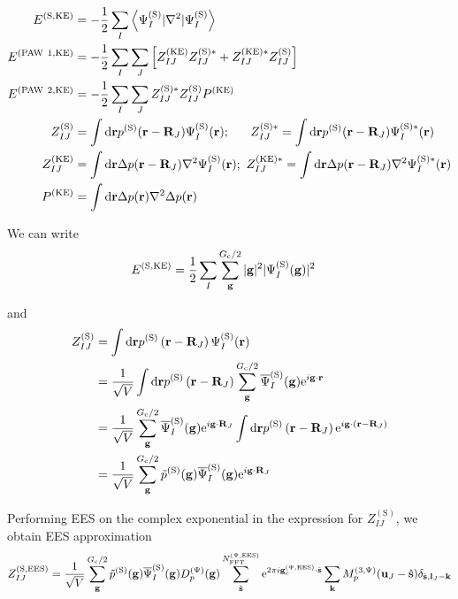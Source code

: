 \documentclass[paper=a4, fontsize=11pt]{article} %
\numberwithin{equation}{section} %
\numberwithin{figure}{section} %
\numberwithin{table}{section} %
\newcommand{\bu}{{\bf{u}}}
\newcommand{\bl}{{\bf{l}}}
\newcommand{\bk}{{\bf{k}}}
\newcommand{\bs}{{\bf{s}}}
\newcommand{\bg}{{\bf{g}}}
\newcommand{\br}{{\bf{r}}}
\newcommand{\bR}{{\bf{R}}}
\newcommand{\rS}{{\mathrm{S}}}
\newcommand{\rKE}{{\mathrm{KE}}}
\newcommand{\rEES}{{\mathrm{EES}}}
\newcommand{\re}{{\mathrm{e}}}
\newcommand{\rP}{{\mathrm{PAW}}}
\newcommand{\rd}{{\mathrm{d}}}
\newcommand{\ibgR}{i\bg\cdot\bR}
\newcommand{\ibgr}{i\bg\cdot\br}
\newcommand{\gcpEES}{{\bg_c^{(\Psi,\rEES)}}}
\newcommand{\igcps}{2\pi i\gcpEES\cdot\hat \bs}
\newcommand{\psigs}{{\overline \Psi_I^{(\rS)}(\bg)}}
\newcommand{\NFFTpEES}{{N^{\mathrm{(\Psi,\rEES})}_{\mathrm{FFT}}}}
\newcommand{\Gc}{{G_{\mathrm{c}}}}
\newcommand{\Dpg}{{D^{(\Psi)}_p(\bg)}}
\newcommand{\Mp}{{M_p^{(3,\Psi)}}}
\begin{document}
\begin{equation}
\begin{split}
E^{(\rS,\rKE)}
& = -\frac{1}{2}\sum_I \left<\Psi_I^{(\rS)}|\nabla^2|\Psi_I^{(\rS)}\right> \\
E^{(\rP\ 1,\rKE)}
&= -\frac{1}{2}\sum_I \sum_J \left[Z_{IJ}^{(\rKE)}Z_{IJ}^{(\rS)*} + Z_{IJ}^{(\rKE)*}Z_{IJ}^{(\rS)} \right]\\
E^{(\rP\ 2,\rKE)}
&= -\frac{1}{2}\sum_I \sum_J Z_{IJ}^{(\rS)*}Z_{IJ}^{(\rS)}P^{(\rKE)}\\
Z_{IJ}^{(\rS)}
& = \int \rd\br  p^{(\rS)}( \br -\bR_J )\Psi_I^{(\rS)}(\br);\ \ \ \ \ Z_{IJ}^{(\rS)*}
= \int \rd\br  p^{(\rS)}( \br -\bR_J )\Psi_I^{(\rS)*}(\br)  \\
Z_{IJ}^{(\rKE)}
& = \int \rd\br\Delta p( \br -\bR_J )\nabla^2\Psi_I^{(\rS)}(\br);\ Z_{IJ}^{(\rKE)*}
= \int \rd\br  \Delta p( \br -\bR_J )\nabla^2\Psi_I^{(\rS)*}(\br)   \\
P^{(\rKE)} 
& = \int \rd\br \Delta p(\br)\nabla^2 \Delta p(\br) \\
\end{split}
\end{equation}


We can write
\begin{equation}
\begin{split}
E^{(\rS,\rKE)}
&= \frac{1}{2}\sum_I \sum_\bg^{\Gc/2} |\bg|^2 |\Psi_I^{(\rS)}(\bg)|^2
\end{split}
\end{equation}


and
\begin{equation}
\begin{split}
Z_{IJ}^{(\rS)}
& = \int \rd\br  p^{(\rS)}\left( \br-\bR_J \right)\Psi_I^{(\rS)}(\br) \\
& = \frac{1}{\sqrt{V}}\int \rd\br  p^{(\rS)}\left( \br-\bR_J \right) \sum_\bg^{\Gc/2} \psigs \re^{\ibgr} \\
& = \frac{1}{\sqrt{V}}\sum_\bg^{\Gc/2} \psigs \re^{\ibgR_J}\int \rd\br  p^{(\rS)}\left( \br-\bR_J \right)\re^{ i \bg\cdot(\br-\bR_J)} \\
& = \frac{1}{\sqrt{V}}\sum_\bg^{\Gc/2} \tilde p^{(\rS)} (\bg)\psigs \re^{\ibgR_J}\\
\end{split}
\end{equation}

Performing EES on the complex exponential in the expression for $Z_{IJ}^{(\rS)}$, we obtain EES approximation
\begin{equation}\label{eq:ZSEES}
Z_{IJ}^{(\rS,\rEES)}= \frac{1}{\sqrt{V}}\sum_{\bg}^{\Gc/2} \tilde p^{(\rS)} (\bg)\psigs \Dpg \sum_{\hat \bs}^{\NFFTpEES} \re^{\igcps} \sum_{\bk}\Mp(\bu_{J}-\hat \bs)\delta_{\hat \bs,\bl_J-\bk}
\end{equation}
\end{document}
